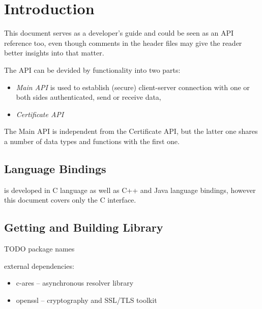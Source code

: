 %
%

\section{Introduction}

This document serves as a developer's guide and could be
seen as an API reference too, even though comments in
the header files may give the reader better insights into that matter.

The \CANL API can be devided by functionality into two parts:

\begin{itemize}
\item \textit{\CANL Main API} is used to establish (secure) client-server
connection with one or both sides authenticated, send or receive data,
\item \textit{\CANL Certificate API}
\end{itemize}
The Main API is independent from the Certificate API, but the latter
one shares a number of data types and functions with the first one.

\subsection{Language Bindings}
\CANL is developed in C language as well as C++ and Java language bindings,
however this document covers only the C interface.

\subsection{Getting and Building Library}
TODO package names

external dependencies:
\begin{itemize}
\item c-ares -- asynchronous resolver library
\item openssl -- cryptography and SSL/TLS toolkit
\end{itemize}

